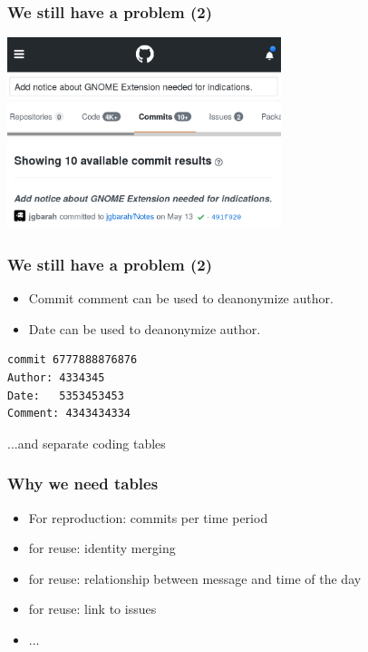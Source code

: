 \documentclass[17pt,aspectratio=169,hyperref={pdfusetitle,colorlinks,allcolors=olive}]{beamer}
\begin{document}
\begin{frame}[fragile]
  \frametitle{We still have a problem (2)}

  \begin{center}
  \includegraphics[width=8cm]{figs/github-comment}
  \end{center}  
  
\end{frame}

\begin{frame}[fragile]
  \frametitle{We still have a problem (2)}

  \begin{itemize}
  \item Commit comment can be used to deanonymize author.
  \item Date can be used to deanonymize author.
  \end{itemize}

{\small
\begin{verbatim}
commit 6777888876876
Author: 4334345
Date:   5353453453
Comment: 4343434334
\end{verbatim}  
}

...and separate coding tables
\end{frame}

\begin{frame}[fragile]
  \frametitle{Why we need tables}

  \begin{itemize}
  \item For reproduction: commits per time period
  \item for reuse: identity merging
  \item for reuse: relationship between message and time of the day
  \item for reuse: link to issues
  \item ...
  \end{itemize}
  
\end{frame}
\end{document}
